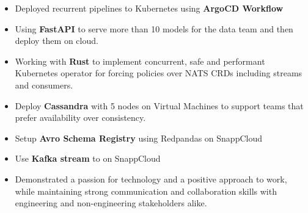 \begin{itemize}
      \item Deployed recurrent pipelines to Kubernetes using \textbf{ArgoCD Workflow}
      \item Using \textbf{FastAPI} to serve more than 10 models for the data team and then deploy them on cloud.
      \item Working with \textbf{Rust} to implement concurrent, safe and performant Kubernetes operator for forcing
            policies over NATS CRDs including streams and consumers.
      \item Deploy \textbf{Cassandra} with 5 nodes on Virtual Machines to support teams that prefer availability over consistency.
      \item Setup \textbf{Avro Schema Registry} using Redpandas on SnappCloud
      \item Use \textbf{Kafka stream} to  on SnappCloud
      \item Demonstrated a passion for technology and a positive approach to work,
            while maintaining strong communication and collaboration skills with engineering
            and non-engineering stakeholders alike.
\end{itemize}

\vspace{0.5cm}

